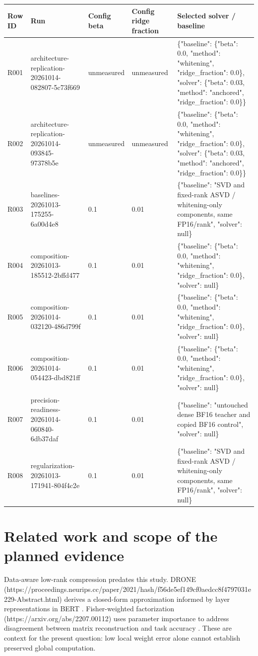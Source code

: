 \documentclass[10pt]{article}
\begin{document}
{\scriptsize\setlength{\tabcolsep}{2pt}
\begin{longtable}{p{}p{}p{}p{}p{}}
Row ID & Run & Config beta & Config ridge fraction & Selected solver / baseline \\
\hline\endhead
R001 & architecture-replication-20261014-082807-5c73f669 & unmeasured & unmeasured & \{"baseline": \{"beta": 0.0, "method": "whitening", "ridge\_fraction": 0.0\}, "solver": \{"beta": 0.03, "method": "anchored", "ridge\_fraction": 0.0\}\} \\
R002 & architecture-replication-20261014-093845-97378b5e & unmeasured & unmeasured & \{"baseline": \{"beta": 0.0, "method": "whitening", "ridge\_fraction": 0.0\}, "solver": \{"beta": 0.03, "method": "anchored", "ridge\_fraction": 0.0\}\} \\
R003 & baselines-20261013-175255-6a00d4e8 & 0.1 & 0.01 & \{"baseline": "SVD and fixed-rank ASVD / whitening-only components, same FP16/rank", "solver": null\} \\
R004 & composition-20261013-185512-2bffd477 & 0.1 & 0.01 & \{"baseline": \{"beta": 0.0, "method": "whitening", "ridge\_fraction": 0.0\}, "solver": null\} \\
R005 & composition-20261014-032120-486d799f & 0.1 & 0.01 & \{"baseline": \{"beta": 0.0, "method": "whitening", "ridge\_fraction": 0.0\}, "solver": null\} \\
R006 & composition-20261014-054423-dbd821ff & 0.1 & 0.01 & \{"baseline": \{"beta": 0.0, "method": "whitening", "ridge\_fraction": 0.0\}, "solver": null\} \\
R007 & precision-readiness-20261014-060840-6db37daf & 0.1 & 0.01 & \{"baseline": "untouched dense BF16 teacher and copied BF16 control", "solver": null\} \\
R008 & regularization-20261013-171941-804f4c2e & 0.1 & 0.01 & \{"baseline": "SVD and fixed-rank ASVD / whitening-only components, same FP16/rank", "solver": null\} \\
\end{longtable}}
\section{Related work and scope of the planned evidence}

Data-aware low-rank compression predates this study. DRONE (https://proceedings.neurips.cc/paper/2021/hash/f56de5ef149cf0aedcc8f4797031e229-Abstract.html)
derives a closed-form approximation informed by layer representations in BERT
\cite{chen2021drone}. Fisher-weighted factorization (https://arxiv.org/abs/2207.00112)
uses parameter importance to address disagreement between matrix reconstruction
and task accuracy \cite{hsu2022weighted}. These are context for the present question:
low local weight error alone cannot establish preserved global computation.
\end{document}
